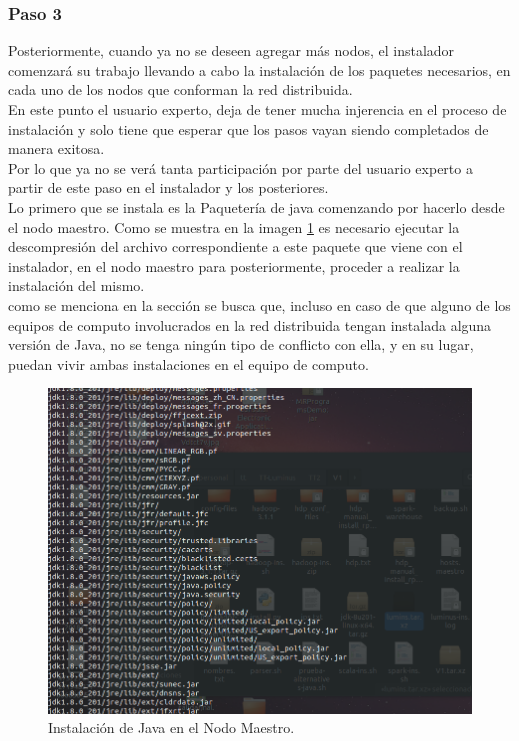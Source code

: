 \subsubsection{Paso 3}
Posteriormente, cuando ya no se deseen agregar más nodos, el instalador comenzará su trabajo llevando a cabo la instalación de los paquetes necesarios, en cada uno de los nodos que conforman la red distribuida.\\
En este punto el usuario experto, deja de tener mucha injerencia en el proceso de instalación y solo tiene que esperar que los pasos vayan siendo completados de manera exitosa. \\
Por lo que ya no se verá tanta participación por parte del usuario experto a partir de este paso en el instalador y los posteriores.\\
Lo primero que se instala es la Paquetería de java comenzando por hacerlo desde el nodo maestro. Como se muestra en la imagen \ref{fig:javamaestro} es necesario ejecutar la descompresión del archivo correspondiente a este paquete que viene con el instalador, en el nodo maestro para posteriormente, proceder a realizar la instalación del mismo.\\
como se menciona en la sección  se busca que, incluso en caso de que alguno de los equipos de computo involucrados en la red distribuida tengan instalada alguna versión de Java, no se tenga ningún tipo de conflicto con ella, y en su lugar, puedan vivir ambas instalaciones en el equipo de computo.
\begin{figure}[H]
	\hypertarget{fig:javamaestro}{\hspace{1pt}}
	\begin{center}	
		\includegraphics[width=.7\textwidth]{capitulo5/images/instalacionjavamaestro.png}
		\caption{Instalación de Java en el Nodo Maestro.}
		\label{fig:javamaestro}
	\end{center}
\end{figure}
